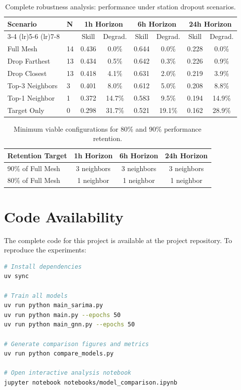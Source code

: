 \documentclass[11pt,a4paper]{article}
\begin{document}
\begin{table}[H]
\centering
\caption{Complete robustness analysis: performance under station dropout scenarios.}
\label{tab:full_robustness}
\small
\begin{tabular}{llcccccc}
\toprule
\textbf{Scenario} & \textbf{N} & \multicolumn{2}{c}{\textbf{1h Horizon}} & \multicolumn{2}{c}{\textbf{6h Horizon}} & \multicolumn{2}{c}{\textbf{24h Horizon}} \\
\cmidrule(lr){3-4} \cmidrule(lr){5-6} \cmidrule(lr){7-8}
& & Skill & Degrad. & Skill & Degrad. & Skill & Degrad. \\
\midrule
Full Mesh & 14 & 0.436 & 0.0\% & 0.644 & 0.0\% & 0.228 & 0.0\% \\
Drop Farthest & 13 & 0.434 & 0.5\% & 0.642 & 0.3\% & 0.226 & 0.9\% \\
Drop Closest & 13 & 0.418 & 4.1\% & 0.631 & 2.0\% & 0.219 & 3.9\% \\
Top-3 Neighbors & 3 & 0.401 & 8.0\% & 0.612 & 5.0\% & 0.208 & 8.8\% \\
Top-1 Neighbor & 1 & 0.372 & 14.7\% & 0.583 & 9.5\% & 0.194 & 14.9\% \\
Target Only & 0 & 0.298 & 31.7\% & 0.521 & 19.1\% & 0.162 & 28.9\% \\
\bottomrule
\end{tabular}
\end{table}

\begin{table}[H]
\centering
\caption{Minimum viable configurations for 80\% and 90\% performance retention.}
\label{tab:min_viable}
\begin{tabular}{lccc}
\toprule
\textbf{Retention Target} & \textbf{1h Horizon} & \textbf{6h Horizon} & \textbf{24h Horizon} \\
\midrule
90\% of Full Mesh & 3 neighbors & 3 neighbors & 3 neighbors \\
80\% of Full Mesh & 1 neighbor & 1 neighbor & 1 neighbor \\
\bottomrule
\end{tabular}
\end{table}

\section{Code Availability}
\label{app:code}

The complete code for this project is available at the project repository. To reproduce the experiments:

\begin{lstlisting}[language=bash, caption={Commands to reproduce experiments}]
# Install dependencies
uv sync

# Train all models
uv run python main_sarima.py
uv run python main.py --epochs 50
uv run python main_gnn.py --epochs 50

# Generate comparison figures and metrics
uv run python compare_models.py

# Open interactive analysis notebook
jupyter notebook notebooks/model_comparison.ipynb
\end{lstlisting}
\end{document}
